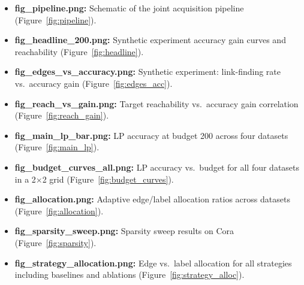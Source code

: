 \documentclass[12pt,a4paper,oneside]{report}
\begin{document}
\begin{itemize}[leftmargin=2em]
    \item \textbf{fig\_pipeline.png:} Schematic of the joint acquisition pipeline (Figure~\ref{fig:pipeline}).
    \item \textbf{fig\_headline\_200.png:} Synthetic experiment accuracy gain curves and reachability (Figure~\ref{fig:headline}).
    \item \textbf{fig\_edges\_vs\_accuracy.png:} Synthetic experiment: link-finding rate vs.\ accuracy gain (Figure~\ref{fig:edges_acc}).
    \item \textbf{fig\_reach\_vs\_gain.png:} Target reachability vs.\ accuracy gain correlation (Figure~\ref{fig:reach_gain}).
    \item \textbf{fig\_main\_lp\_bar.png:} LP accuracy at budget 200 across four datasets (Figure~\ref{fig:main_lp}).
    \item \textbf{fig\_budget\_curves\_all.png:} LP accuracy vs.\ budget for all four datasets in a 2$\times$2 grid (Figure~\ref{fig:budget_curves}).
    \item \textbf{fig\_allocation.png:} Adaptive edge/label allocation ratios across datasets (Figure~\ref{fig:allocation}).
    \item \textbf{fig\_sparsity\_sweep.png:} Sparsity sweep results on Cora (Figure~\ref{fig:sparsity}).
    \item \textbf{fig\_strategy\_allocation.png:} Edge vs.\ label allocation for all strategies including baselines and ablations (Figure~\ref{fig:strategy_alloc}).
\end{itemize}
\end{document}
